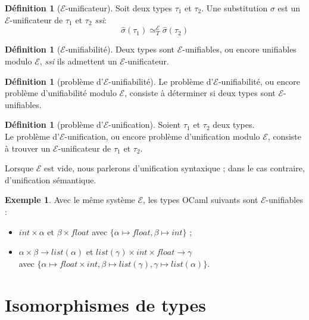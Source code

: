 \documentclass[a4paper]{report}
\theoremstyle{definition}
\newtheorem{definition}[theoreme]{Définition}
\newtheorem{exemple}[theoreme]{Exemple}
\newcommand{\ssi}{\textit{ssi}\xspace}
\newcommand{\E}{\mathscr E}
\newcommand{\Tequiv}{\simeq_T}
\newcommand{\TEequiv}{\Tequiv^\E}
\begin{document}
\begin{definition}[$\E$-unificateur]
	Soit deux types $\tau_1$ et $\tau_2$.
	Une substitution $\sigma$ est un $\E$-unificateur de $\tau_1$ et $\tau_2$ \ssi :
	\[ \hat \sigma (\tau_1) \TEequiv \hat \sigma (\tau_2) \]
\end{definition}

\begin{definition}[$\E$-unifiabilité]
	Deux types sont $\E$-unifiables, ou encore unifiables modulo $\E$, \ssi ils admettent un $\E$-unificateur.
\end{definition}

\begin{definition}[problème d'$\E$-unifiabilité]
	Le problème d'$\E$-unifiabilité, ou encore problème d'unifiabilité modulo $\E$, consiste à déterminer si deux types sont $\E$-unifiables.
\end{definition}

\begin{definition}[problème d'$\E$-unification]
	Soient $\tau_1$ et $\tau_2$ deux types. \\
	Le problème d'$\E$-unification, ou encore problème d'unification modulo $\E$, consiste à trouver un $\E$-unificateur de $\tau_1$ et $\tau_2$.
\end{definition}

Lorsque $\E$ est vide, nous parlerons d'unification syntaxique ; dans le cas contraire, d'unification sémantique.

\begin{exemple}
	Avec le même système $\E$, les types OCaml suivants sont $\E$-unifiables :
	\begin{itemize}
		\item $int \times \alpha$ et $\beta \times float$ avec $\{ \alpha \mapsto float, \beta \mapsto int \}$ ;
		\item $\alpha \times \beta \rightarrow list (\alpha)$ et $list (\gamma) \times int \times float \rightarrow \gamma$ \\ avec $\{ \alpha \mapsto float \times int, \beta \mapsto list (\gamma), \gamma \mapsto list (\alpha) \}$.
	\end{itemize}
\end{exemple}


\section{Isomorphismes de types}
\end{document}

